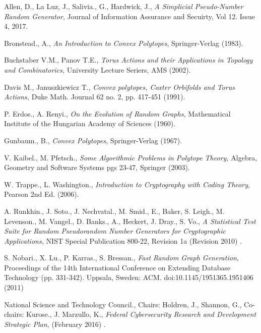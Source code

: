 \documentclass[oneside,12pt]{amsart}
\theoremstyle{definition}
\numberwithin{equation}{section}
\begin{document}
\clearpage
\begin{thebibliography}{14}

 Allen, D., La Luz, J., Salivia., G., Hardwick, J.,
{\emph{A Simplicial Pseudo-Number Random Generator}},
Journal of Information Assurance and Secuirty, Vol 12. Issue 4, 2017.

 Bronstead., A.,
{\emph{An Introduction to Convex Polytopes}},
Springer-Verlag (1983).

 Buchstaber V.M., Panov T.E.,
 {\textit{Torus Actions and their Applications in Topology and Combinatorics,}}
 University Lecture Seriers, AMS (2002).

 Davis M., Januszkiewicz T.,
{\em{Convex polytopes, Coxter Orbifolds and Torus Actions,}} Duke
Math. Journal 62 no. 2, pp. 417-451 (1991).

 P. Erdos., A. Renyi.,
 {\textit{On the Evolution of Random Graphs,}}
 Mathematical Institute of the Hungarian Academy of Sciences (1960).

 Gunbaum., B.,
{\emph{Convex Polytopes}},
Springer-Verlag (1967).

 V. Kaibel., M. Pfetsch.,
 {\textit{Some Algorithmic Problems in Polytope Theory,}}
 Algebra, Geometry and Software Systems pgs 23-47, Springer (2003).

 W. Trappe., L. Washington.,
 {\textit{Introduction to Cryptography with Coding Theory,}}
 Pearson 2nd Ed. (2006).

 A. Runkhin., J. Soto., J. Nechvatal., M. Smid., E., Baker, S. Leigh., M. Levenson., M. Vangel.,
D. Banks., A., Heckert, J. Dray., S. Vo.,
 {\textit{A Statistical Test Suite for Random Pseudorandom Number Generators for Cryptographic Applications,}}
 NIST Special Publication 800-22, Revision 1a (Revision 2010) .

 S. Nobari., X. Lu., P. Karras., S. Bressan.,
{\textit{Fast Random Graph Generation,}} Proceedings of the 14th International Conference on Extending Database
Technology (pp. 331-342). Uppsala, Sweden: ACM. doi:10.1145/1951365.1951406  (2011)

 National Science and Technology Council., Chairs:  Holdren, J., Shannon, G., Co-chairs: Kurose., J. Marzullo, K.,
 {\textit{Federal Cybersecurity Research and Development Strategic Plan,}}
(February 2016) .




\end{thebibliography}
\end{document}
